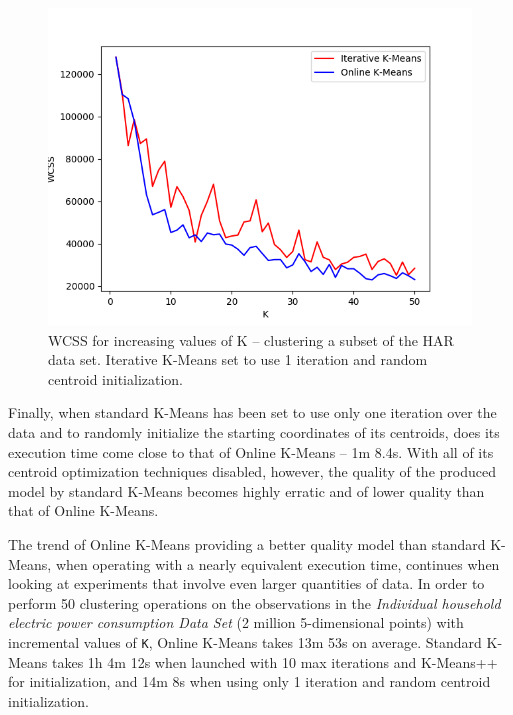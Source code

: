 \documentclass{l4proj}
\begin{document}
\begin{figure}[H]
	\centering
    \label{fig:res5}
    \includegraphics[width=1.0\textwidth]{images/result5}
    \caption{WCSS for increasing values of K -- clustering a subset of the HAR data set. Iterative K-Means set to use 1 iteration and random centroid initialization. } 
\end{figure}

Finally, when standard K-Means has been set to use only one iteration over the data  and to randomly initialize the starting coordinates of its centroids, does its execution time come close to that of Online K-Means -- 1m 8.4s. With all of its centroid optimization techniques disabled, however, the quality of the produced model by standard K-Means becomes highly erratic and of lower quality than that of Online K-Means.

The trend of Online K-Means providing a better quality model than standard K-Means, when operating with a nearly equivalent execution time, continues when looking at experiments that involve even larger quantities of data. In order to perform 50 clustering operations on the observations in the \textit{Individual household electric power consumption Data Set} (2 million 5-dimensional points) with incremental values of \texttt{K}, Online K-Means takes 13m 53s on average. Standard K-Means takes 1h 4m 12s when launched with 10 max iterations and K-Means++ for initialization,  and 14m 8s when using only 1 iteration and random centroid initialization.
\end{document}
